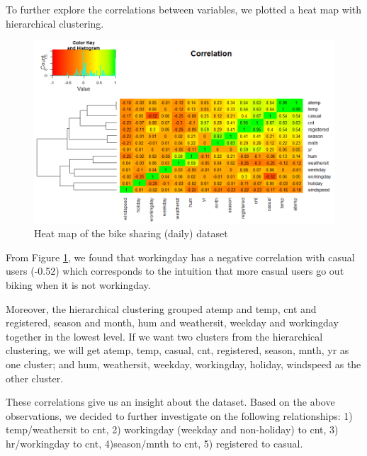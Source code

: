 \documentclass[12pt]{article}
\begin{document}
    To further explore the correlations between variables, we plotted a heat map with hierarchical clustering. 
	\begin{figure}[H]
		\includegraphics[scale=0.6]{figures/correlation.png}
		\caption{Heat map of the bike sharing (daily) dataset}
		\label{fig:correlation}
	\end{figure}
	From Figure \ref{fig:correlation}, we found that workingday has a negative correlation with casual users (-0.52) which corresponds to the intuition that more casual users go out biking when it is not workingday. 
	
	Moreover, the hierarchical clustering grouped atemp and temp, cnt and registered, season and month, hum and weathersit, weekday and workingday together in the lowest level.  If we want two clusters from the hierarchical clustering, we will get atemp, temp, casual, cnt, registered, season, mnth, yr as one cluster; and hum, weathersit, weekday, workingday, holiday, windspeed as the other cluster.
	
	These correlations give us an insight about the dataset. 	Based on the above observations, we decided to further investigate on the following relationships: 1) temp/weathersit to cnt, 2) workingday (weekday and non-holiday) to cnt, 3) hr/workingday to cnt, 4)season/mnth to cnt, 5) registered to casual. 
	
	
\end{document}
